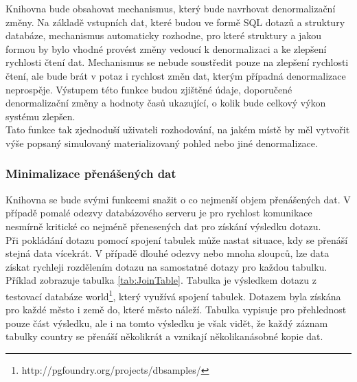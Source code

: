 \documentclass[ing,male,java,dept456]{diploma}						%
\begin{document}
Knihovna bude obsahovat mechanismus, který bude navrhovat denormalizační změny. Na základě vstupních dat, které budou ve formě SQL dotazů a struktury databáze, mechanismus automaticky rozhodne, pro které struktury a jakou formou by bylo vhodné provést změny vedoucí k denormalizaci a ke zlepšení rychlosti čtení dat. Mechanismus se nebude soustředit pouze na zlepšení rychlosti čtení, ale bude brát v potaz i rychlost změn dat, kterým případná denormalizace neprospěje. Výstupem této funkce budou zjištěné údaje, doporučené denormalizační změny a hodnoty časů ukazující, o kolik bude celkový výkon systému zlepšen. \\
Tato funkce tak zjednoduší uživateli rozhodování, na jakém místě by měl vytvořit výše popsaný simulovaný materializovaný pohled nebo jiné denormalizace.

\subsubsection{Minimalizace přenášených dat}
\label{subsubsec:Selectin}

Knihovna se bude svými funkcemi snažit o co nejmenší objem přenášených dat. V případě pomalé odezvy databázového serveru je pro rychlost komunikace nesmírně kritické co nejméně přenesených dat pro získání výsledku dotazu. \\
Při pokládání dotazu pomocí spojení tabulek může nastat situace, kdy se přenáší stejná data vícekrát. V případě dlouhé odezvy nebo mnoha sloupců, lze data získat rychleji rozdělením dotazu na samostatné dotazy pro každou tabulku. Příklad zobrazuje tabulka \ref{tab:JoinTable}. Tabulka je výsledkem dotazu z testovací databáze world\footnote{http://pgfoundry.org/projects/dbsamples/}, který využívá spojení tabulek. Dotazem byla získána pro každé město i země do, které město náleží. Tabulka vypisuje pro přehlednost pouze část výsledku, ale i na tomto výsledku je však vidět, že každý záznam tabulky country se přenáší několikrát a vznikají několikanásobné kopie dat. \\
\end{document}
